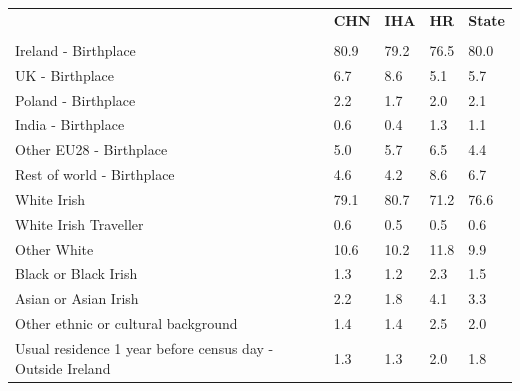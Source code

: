 \documentclass{article}
\begin{document}
\pagebreak
\begin{table}[h]	
\centering
		\begin{tabular}{KTTTT}
  \hline
& \textbf{CHN} & \textbf{IHA} & \textbf{HR}& \textbf{State}\\ 
  \hline
    \\ 
    \hline
Ireland - Birthplace & 80.9& 79.2& 76.5& 80.0\\
UK - Birthplace & 6.7& 8.6& 5.1& 5.7\\
Poland - Birthplace & 2.2& 1.7& 2.0& 2.1\\
India - Birthplace & 0.6& 0.4& 1.3& 1.1\\
Other EU28 - Birthplace & 5.0& 5.7& 6.5& 4.4\\
Rest of world - Birthplace & 4.6& 4.2& 8.6& 6.7\\
    \hline
White Irish & 79.1& 80.7& 71.2& 76.6\\
White Irish Traveller & 0.6& 0.5& 0.5& 0.6\\
Other White & 10.6& 10.2& 11.8&  9.9\\
Black or Black Irish & 1.3& 1.2& 2.3& 1.5\\
Asian or Asian Irish & 2.2& 1.8& 4.1& 3.3\\
Other ethnic or cultural background & 1.4& 1.4& 2.5& 2.0\\
    \hline
Usual residence 1 year before census day - Outside Ireland & 1.3& 1.3& 2.0& 1.8\\


\end{tabular}
\end{table}
\end{document}
